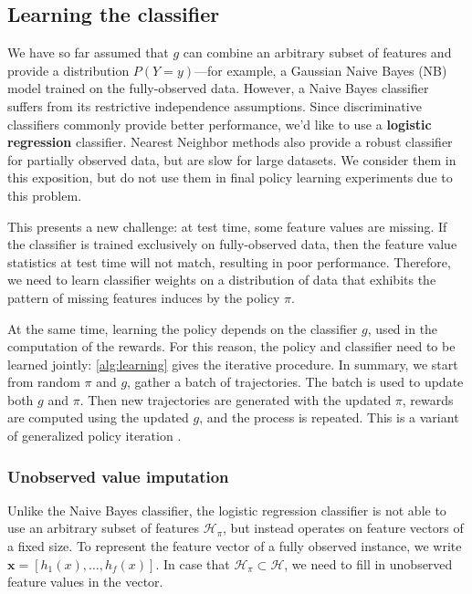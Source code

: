\subsection{Learning the classifier}\label{sec:clf_classifier}

We have so far assumed that $g$ can combine an arbitrary subset of features and provide a distribution $P(Y = y)$---for example, a Gaussian Naive Bayes (NB) model trained on the fully-observed data.
However, a Naive Bayes classifier suffers from its restrictive independence assumptions.
Since discriminative classifiers commonly provide better performance, we'd like to use a \textbf{logistic regression} classifier.
Nearest Neighbor methods also provide a robust classifier for partially observed data, but are slow for large datasets.
We consider them in this exposition, but do not use them in final policy learning experiments due to this problem.

This presents a new challenge: at test time, some feature values are missing.
If the classifier is trained exclusively on fully-observed data, then the feature value statistics at test time will not match, resulting in poor performance.
Therefore, we need to learn classifier weights on a distribution of data that exhibits the pattern of missing features induces by the policy $\pi$.



At the same time, learning the policy depends on the classifier $g$, used in the computation of the rewards.
For this reason, the policy and classifier need to be learned jointly: \autoref{alg:learning} gives the iterative procedure.
In summary, we start from random $\pi$ and $g$, gather a batch of trajectories.
The batch is used to update both $g$ and $\pi$.
Then new trajectories are generated with the updated $\pi$, rewards are computed using the updated $g$, and the process is repeated.
This is a variant of generalized policy iteration \cite{Sutton1998}.

\subsubsection{Unobserved value imputation}

Unlike the Naive Bayes classifier, the logistic regression classifier is not able to use an arbitrary subset of features $\mathcal{H}_\pi$, but instead operates on feature vectors of a fixed size.
To represent the feature vector of a fully observed instance, we write $\mathbf{x} = [h_1(x), \dots, h_f(x)]$.
In case that $\mathcal{H}_\pi \subset \mathcal{H}$, we need to fill in unobserved feature values in the vector.

